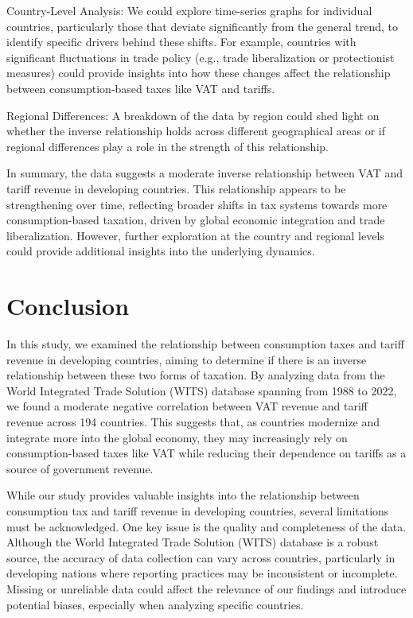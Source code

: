 \documentclass[12pt]{article}
\begin{document}
Country-Level Analysis: We could explore time-series graphs for individual countries, particularly those that deviate significantly from the general trend, to identify specific drivers behind these shifts. For example, countries with significant fluctuations in trade policy (e.g., trade liberalization or protectionist measures) could provide insights into how these changes affect the relationship between consumption-based taxes like VAT and tariffs.

Regional Differences: A breakdown of the data by region could shed light on whether the inverse relationship holds across different geographical areas or if regional differences play a role in the strength of this relationship.

In summary, the data suggests a moderate inverse relationship between VAT and tariff revenue in developing countries. This relationship appears to be strengthening over time, reflecting broader shifts in tax systems towards more consumption-based taxation, driven by global economic integration and trade liberalization. However, further exploration at the country and regional levels could provide additional insights into the underlying dynamics.

\section{Conclusion}
\label{sec:conclusion}

In this study, we examined the relationship between consumption taxes and tariff revenue in developing countries, aiming to determine if there is an inverse relationship between these two forms of taxation. By analyzing data from the World Integrated Trade Solution (WITS) database spanning from 1988 to 2022, we found a moderate negative correlation between VAT revenue and tariff revenue across 194 countries. This suggests that, as countries modernize and integrate more into the global economy, they may increasingly rely on consumption-based taxes like VAT while reducing their dependence on tariffs as a source of government revenue.

While our study provides valuable insights into the relationship between consumption tax and tariff revenue in developing countries, several limitations must be acknowledged. One key issue is the quality and completeness of the data. Although the World Integrated Trade Solution (WITS) database is a robust source, the accuracy of data collection can vary across countries, particularly in developing nations where reporting practices may be inconsistent or incomplete. Missing or unreliable data could affect the relevance of our findings and introduce potential biases, especially when analyzing specific countries. 
\end{document}
